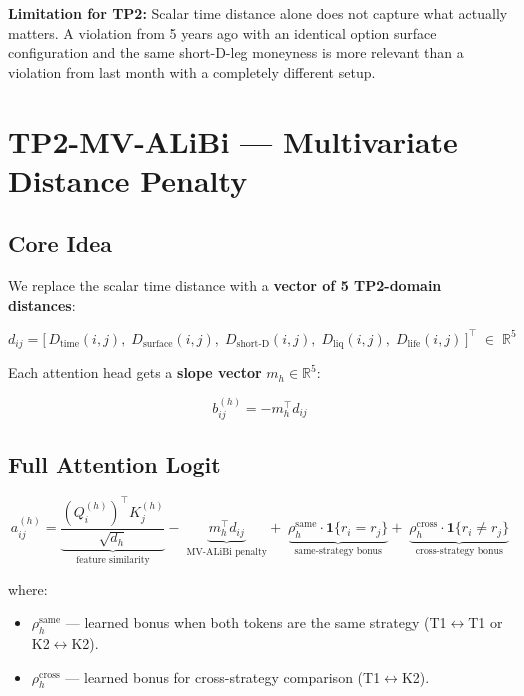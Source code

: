 \documentclass[11pt]{article}
\newcommand{\R}{\mathbb{R}}
\newcommand{\1}{\mathbf{1}}
\begin{document}
\textbf{Limitation for TP2:} Scalar time distance alone does not capture what
actually matters. A violation from 5 years ago with an identical option surface
configuration and the same short-D-leg moneyness is more relevant than a
violation from last month with a completely different setup.

\section{TP2-MV-ALiBi --- Multivariate Distance Penalty}

\subsection{Core Idea}

We replace the scalar time distance with a \textbf{vector of 5 TP2-domain
distances}:

\[
  d_{ij}
  =
  \bigl[\,
    D_{\mathrm{time}}(i,j),\;
    D_{\mathrm{surface}}(i,j),\;
    D_{\mathrm{short\text{-}D}}(i,j),\;
    D_{\mathrm{liq}}(i,j),\;
    D_{\mathrm{life}}(i,j)
  \,\bigr]^\top
  \;\in\; \R^5
\]

Each attention head gets a \textbf{slope vector} $m_h \in \R^5$:

\[
  b_{ij}^{(h)} = -m_h^\top d_{ij}
\]

\subsection{Full Attention Logit}

\[
  \boxed{
  a_{ij}^{(h)}
  =
  \underbrace{\frac{(Q_i^{(h)})^\top K_j^{(h)}}{\sqrt{d_h}}}_{\text{feature similarity}}
  -\;
  \underbrace{m_h^\top d_{ij}}_{\text{MV-ALiBi penalty}}
  +\;
  \underbrace{\rho_h^{\mathrm{same}} \cdot \1\{r_i = r_j\}}_{\text{same-strategy bonus}}
  +\;
  \underbrace{\rho_h^{\mathrm{cross}} \cdot \1\{r_i \neq r_j\}}_{\text{cross-strategy bonus}}
  }
\]

where:
\begin{itemize}[leftmargin=*]
  \item $\rho_h^{\mathrm{same}}$ --- learned bonus when both tokens are the same
        strategy (T1$\leftrightarrow$T1 or K2$\leftrightarrow$K2).
  \item $\rho_h^{\mathrm{cross}}$ --- learned bonus for cross-strategy comparison
        (T1$\leftrightarrow$K2).
\end{itemize}
\end{document}
